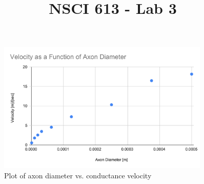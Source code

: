 \documentclass[12pt]{article}
\title{NSCI 613 - Lab 3}
\author{\phoName}
\newcommand{\githubRepoNameFormat}[1]{ \textsl{\footnotesize#1} }
\newcommand{\github}[2]{\href{#1}{\githubRepoNameFormat{#2}}}
\newcommand{\githubFromShortName}[3]{\github{https://github.com/#1/#2}{#3}}
\newcommand{\phoGithub}[2]{\githubFromShortName{CommanderPho}{#1}{#2}}
\begin{document}
\maketitle

\updateheaders
\clearpage








\begin{figure}[H]
\centering
\includegraphics[width=0.9\textwidth]{Results/1a-1}
\caption{\label{fig:P1a1} Plot of axon diameter vs. conductance velocity }
\end{figure}

\end{document}
